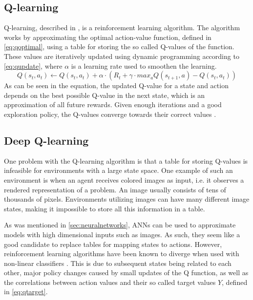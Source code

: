 \documentclass{kththesis}
\begin{document}
\subsection{Q-learning}
\label{subsec:qlearning}
Q-learning, described in \textcite{watkins1992q}, is a reinforcement learning algorithm. The algorithm works by approximating the optimal action-value function, defined in \autoref{eq:qoptimal}, using a table for storing the so called Q-values of the function. These values are iteratively updated using dynamic programming according to \autoref{eq:qupdate}, where $\alpha$ is a learning rate used to smoothen the learning. 
\begin{equation}
\label{eq:qupdate}
Q(s_t, a_t) \leftarrow Q(s_t, a_t) + \alpha \cdot (R_t + \gamma \cdot max_a Q(s_{t+1}, a) - Q(s_t, a_t))
\end{equation}
As can be seen in the equation, the updated Q-value for a state and action depends on the best possible Q-value in the next state, which is an approximation of all future rewards. Given enough iterations and a good exploration policy, the Q-values converge towards their correct values \parencite{watkins1992q}.

\subsection{Deep Q-learning}
\label{subsec:deepqlearning}
One problem with the Q-learning algorithm is that a table for storing Q-values is infeasible for environments with a large state space. One example of such an environment is when an agent receives colored images as input, i.e. it observes a rendered representation of a problem. An image usually consists of tens of thousands of pixels. Environments utilizing images can have many different image states, making it impossible to store all this information in a table.

As was mentioned in \autoref{sec:neuralnetworks}, ANNs can be used to approximate models with high dimensional inputs such as images. As such, they seem like a good candidate to replace tables for mapping states to actions. However, reinforcement learning algorithms have been known to diverge when used with non-linear classifiers \parencite{tsitsiklis1997analysis}. This is due to subsequent states being related to each other, major policy changes caused by small updates of the Q function, as well as the correlations between action values and their so called target values $Y$, defined in \autoref{eq:qtarget}.
\end{document}
